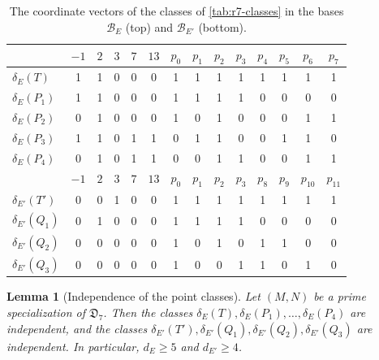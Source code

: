 \documentclass[12pt,oneside,openany]{book}
\theoremstyle{definition}
\theoremstyle{plain}
\numberwithin{equation}{chapter}
\theoremstyle{plain}
\newtheorem{lemma}[lemma]{Lemma}
\theoremstyle{definition}
\theoremstyle{remark}
\newcommand{\datum}{\mathfrak D}
\newcommand{\cB}{\mathcal B}
\begin{document}
\begin{table}[htbp]
\centering
\caption{The coordinate vectors of the classes of \cref{tab:r7-classes} in
the bases $\cB_E$ (top) and $\cB_{E'}$ (bottom).}
\label{tab:r7-vectors}
\small
\setlength{\tabcolsep}{4pt}
\begin{tabular}{l@{\hspace{10pt}}ccccc@{\hspace{12pt}}cccccccc}
\toprule
 & $-1$ & $2$ & $3$ & $7$ & $13$ & $p_0$ & $p_1$ & $p_2$ & $p_3$ & $p_4$ & $p_5$ & $p_6$ & $p_7$\\
\midrule
$\delta_E(T)$ & 1 & 1 & 0 & 0 & 0 & 1 & 1 & 1 & 1 & 1 & 1 & 1 & 1\\
$\delta_E(P_1)$ & 1 & 1 & 0 & 0 & 0 & 1 & 1 & 1 & 1 & 0 & 0 & 0 & 0\\
$\delta_E(P_2)$ & 0 & 1 & 0 & 0 & 0 & 1 & 0 & 1 & 0 & 0 & 0 & 1 & 1\\
$\delta_E(P_3)$ & 1 & 1 & 0 & 1 & 1 & 0 & 1 & 1 & 0 & 0 & 1 & 1 & 0\\
$\delta_E(P_4)$ & 0 & 1 & 0 & 1 & 1 & 0 & 0 & 1 & 1 & 0 & 0 & 1 & 1\\
\midrule
 & $-1$ & $2$ & $3$ & $7$ & $13$ & $p_0$ & $p_1$ & $p_2$ & $p_3$ & $p_8$ & $p_9$ & $p_{10}$ & $p_{11}$\\
\midrule
$\delta_{E'}(T')$ & 0 & 0 & 1 & 0 & 0 & 1 & 1 & 1 & 1 & 1 & 1 & 1 & 1\\
$\delta_{E'}(Q_1)$ & 0 & 1 & 0 & 0 & 0 & 1 & 1 & 1 & 1 & 0 & 0 & 0 & 0\\
$\delta_{E'}(Q_2)$ & 0 & 0 & 0 & 0 & 0 & 1 & 0 & 1 & 0 & 1 & 1 & 0 & 0\\
$\delta_{E'}(Q_3)$ & 0 & 0 & 0 & 0 & 0 & 1 & 0 & 0 & 1 & 1 & 0 & 1 & 0\\
\bottomrule
\end{tabular}
\end{table}

\begin{lemma}[Independence of the point classes]\label{lem:r7-independent}
Let $(M,N)$ be a prime specialization of $\datum_7$. Then the classes
$\delta_E(T),\delta_E(P_1),\dots,\delta_E(P_4)$ are independent, and the
classes $\delta_{E'}(T'),\delta_{E'}(Q_1),\delta_{E'}(Q_2),\delta_{E'}(Q_3)$
are independent. In particular, $d_E\ge5$ and $d_{E'}\ge4$.
\end{lemma}
\end{document}
